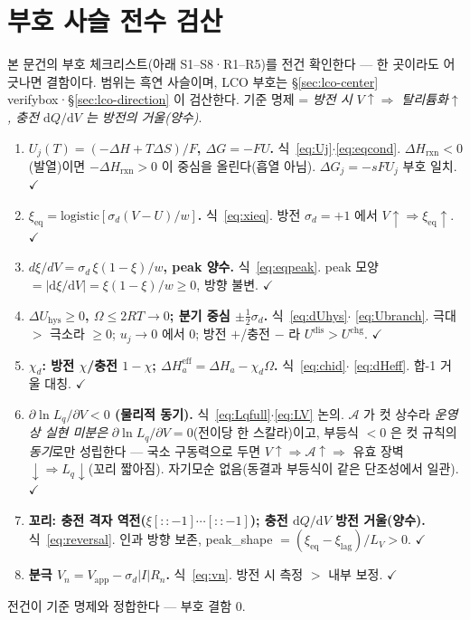 \documentclass[11pt,a4paper]{article}
\newcommand{\dd}{\mathrm{d}}
\newcommand{\eff}{\mathrm{eff}}
\newcommand{\eq}{\mathrm{eq}}
\newcommand{\app}{\mathrm{app}}
\newcommand{\rxn}{\mathrm{rxn}}
\newcommand{\dis}{\mathrm{dis}}
\newcommand{\chg}{\mathrm{chg}}
\newcommand{\hys}{\mathrm{hys}}
\begin{document}
\section{부호 사슬 전수 검산}\label{sec:signcheck}
본 문건의 부호 체크리스트(아래 S1--S8·R1--R5)를 전건 확인한다 — 한 곳이라도 어긋나면 결함이다. 범위는 흑연
사슬이며, LCO 부호는 \S\ref{sec:lco-center} verifybox·\S\ref{sec:lco-direction} 이 검산한다. 기준 명제 = \emph{방전 시
$V\!\uparrow\Rightarrow$ 탈리튬화$\uparrow$, 충전 $\dd Q/\dd V$ 는 방전의 거울(양수)}.

\begin{enumerate}[label=\textbf{S\arabic*.},leftmargin=2.6em,itemsep=2pt]
\item \textbf{$U_j(T)=(-\Delta H+T\Delta S)/F$, $\Delta G=-FU$.} 식~\eqref{eq:Uj}$\cdot$\eqref{eq:eqcond}. $\Delta H_\rxn<0$
(발열)이면 $-\Delta H_\rxn>0$ 이 중심을 올린다(흡열 아님). $\Delta G_j=-sFU_j$ 부호 일치. $\checkmark$
\item \textbf{$\xi_\eq=\mathrm{logistic}[\sigma_d(V-U)/w]$.} 식~\eqref{eq:xieq}. 방전 $\sigma_d=+1$ 에서
$V\!\uparrow\Rightarrow\xi_\eq\!\uparrow$. $\checkmark$
\item \textbf{$d\xi/dV=\sigma_d\,\xi(1-\xi)/w$, peak 양수.} 식~\eqref{eq:eqpeak}. peak 모양 $=|\dd\xi/\dd V|=
\xi(1-\xi)/w\ge0$, 방향 불변. $\checkmark$
\item \textbf{$\Delta U_\hys\ge0$, $\Omega\le2RT\to0$; 분기 중심 $\pm\tfrac12\sigma_d$.} 식~\eqref{eq:dUhys}$\cdot$
\eqref{eq:Ubranch}. 극대 $>$ 극소라 $\ge0$; $u_j\to0$ 에서 $0$; 방전 $+$/충전 $-$ 라 $U^{\dis}>U^{\chg}$. $\checkmark$
\item \textbf{$\chi_d$: 방전 $\chi$/충전 $1-\chi$; $\Delta H_a^\eff=\Delta H_a-\chi_d\Omega$.} 식~\eqref{eq:chid}$\cdot$
\eqref{eq:dHeff}. 합-1 거울 대칭. $\checkmark$
\item \textbf{$\partial\ln L_q/\partial V<0$ (물리적 동기).} 식~\eqref{eq:Lqfull}$\cdot$\eqref{eq:LV} 논의. $\mathcal A$ 가
컷 상수라 \emph{운영상 실현 미분은} $\partial\ln L_q/\partial V=0$(전이당 한 스칼라)이고, 부등식 $<0$ 은 컷 규칙의
\emph{동기}로만 성립한다 — 국소 구동력으로 두면 $V\!\uparrow\Rightarrow\mathcal A\!\uparrow\Rightarrow$ 유효 장벽
$\downarrow\Rightarrow L_q\downarrow$(꼬리 짧아짐). 자기모순 없음(동결과 부등식이 같은 단조성에서 일관). $\checkmark$
\item \textbf{꼬리: 충전 격자 역전($\xi[::-1]\cdots[::-1]$); 충전 $\dd Q/\dd V$ 방전 거울(양수).} 식~\eqref{eq:reversal}.
인과 방향 보존, peak\_shape $=(\xi_\eq-\xi_\mathrm{lag})/L_V>0$. $\checkmark$
\item \textbf{분극 $V_n=V_\app-\sigma_d|I|R_n$.} 식~\eqref{eq:vn}. 방전 시 측정 $>$ 내부 보정. $\checkmark$
\end{enumerate}
전건이 기준 명제와 정합한다 — 부호 결함 $0$.
\end{document}

